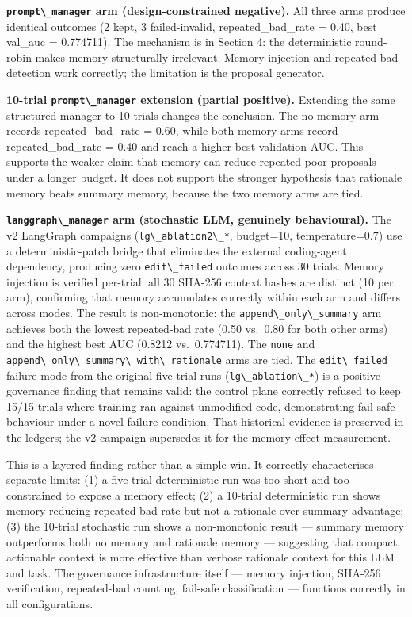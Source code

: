 \textbf{\passthrough{\lstinline!prompt\_manager!} arm (design-constrained negative).} All three arms produce identical outcomes (2 kept, 3 failed-invalid, repeated\_bad\_rate = 0.40, best val\_auc = 0.774711). The mechanism is in Section 4: the deterministic round-robin makes memory structurally irrelevant. Memory injection and repeated-bad detection work correctly; the limitation is the proposal generator.

\textbf{10-trial \passthrough{\lstinline!prompt\_manager!} extension (partial positive).} Extending the same structured manager to 10 trials changes the conclusion. The no-memory arm records repeated\_bad\_rate = 0.60, while both memory arms record repeated\_bad\_rate = 0.40 and reach a higher best validation AUC. This supports the weaker claim that memory can reduce repeated poor proposals under a longer budget. It does not support the stronger hypothesis that rationale memory beats summary memory, because the two memory arms are tied.

\textbf{\passthrough{\lstinline!langgraph\_manager!} arm (stochastic LLM, genuinely behavioural).} The v2 LangGraph campaigns (\passthrough{\lstinline!lg\_ablation2\_*!}, budget=10, temperature=0.7) use a deterministic-patch bridge that eliminates the external coding-agent dependency, producing zero \passthrough{\lstinline!edit\_failed!} outcomes across 30 trials. Memory injection is verified per-trial: all 30 SHA-256 context hashes are distinct (10 per arm), confirming that memory accumulates correctly within each arm and differs across modes. The result is non-monotonic: the \passthrough{\lstinline!append\_only\_summary!} arm achieves both the lowest repeated-bad rate (0.50 vs.\ 0.80 for both other arms) and the highest best AUC (0.8212 vs.\ 0.774711). The \passthrough{\lstinline!none!} and \passthrough{\lstinline!append\_only\_summary\_with\_rationale!} arms are tied. The \passthrough{\lstinline!edit\_failed!} failure mode from the original five-trial runs (\passthrough{\lstinline!lg\_ablation\_*!}) is a positive governance finding that remains valid: the control plane correctly refused to keep 15/15 trials where training ran against unmodified code, demonstrating fail-safe behaviour under a novel failure condition. That historical evidence is preserved in the ledgers; the v2 campaign supersedes it for the memory-effect measurement.

This is a layered finding rather than a simple win. It correctly characterises separate limits: (1) a five-trial deterministic run was too short and too constrained to expose a memory effect; (2) a 10-trial deterministic run shows memory reducing repeated-bad rate but not a rationale-over-summary advantage; (3) the 10-trial stochastic run shows a non-monotonic result --- summary memory outperforms both no memory and rationale memory --- suggesting that compact, actionable context is more effective than verbose rationale context for this LLM and task. The governance infrastructure itself --- memory injection, SHA-256 verification, repeated-bad counting, fail-safe classification --- functions correctly in all configurations.

